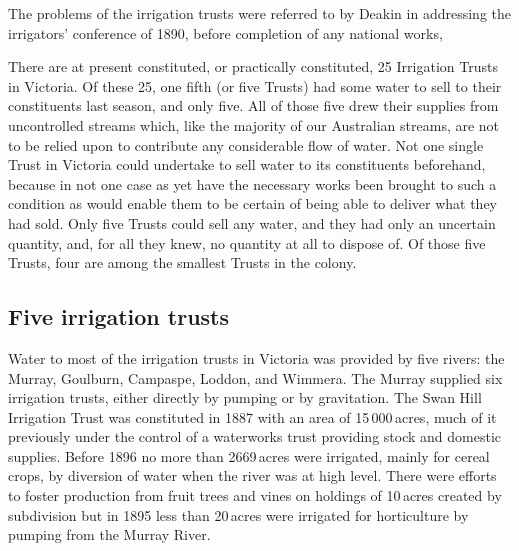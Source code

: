 The problems of the irrigation trusts were referred to by Deakin
 in
addressing the irrigators' conference of 1890, before completion of
any national works,
\begin{Quote}
	There are at present constituted, or practically constituted,
	25 Irrigation Trusts in Victoria.  Of these 25, one fifth (or
	five Trusts) had some water to sell to their constituents last
	season, and only five.  All of those five drew their supplies
	from uncontrolled streams which, like the majority of our
	Australian streams, are not to be relied upon to contribute
	any considerable flow of water. Not one single Trust in
	Victoria could undertake to sell water to its constituents
	beforehand, because in not one case as yet have the necessary
	works been brought to such a condition as would enable them to
	be certain of being able to deliver what they had sold. Only
	five Trusts could sell any water, and they had only an
	uncertain quantity, and, for all they knew, no quantity at all
	to dispose of.  Of those five Trusts, four are among the
	smallest Trusts in the colony.
\end{Quote}

\subsection*{Five irrigation trusts}

Water to most of the irrigation trusts in Victoria was provided by
five rivers: the Murray, Goulburn, Campaspe, Loddon, and Wimmera.  The
Murray supplied six irrigation trusts, either directly by pumping or
by gravitation.  The Swan Hill Irrigation Trust
 was constituted in
1887 with an area of 15\,000\,acres, much of it previously under the
control of a waterworks trust providing stock and domestic supplies.
Before 1896 no more than 2669\,acres were irrigated, main\-ly for
cereal crops, by diversion of water when the river was at high
level. There were efforts to foster production from fruit trees and
vines on holdings of 10\,acres created by subdivision but in 1895 less
than 20\,acres were irrigated for horticulture by pumping from the
Murray River.\fn{VicPP no.\,20 of 1896, RC~Water Supply, Rept.}


